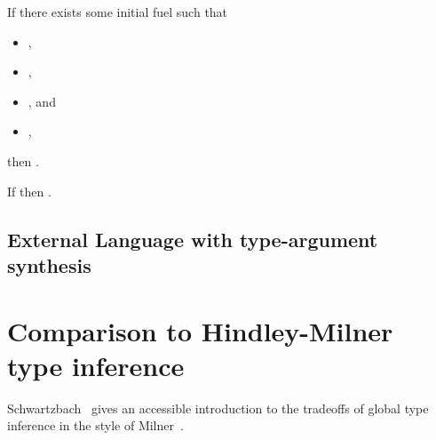 \begin{lemma}
  If there exists some initial fuel \ltiFuel{} such that
  \begin{itemize}
    \item
    \ltitSstkjudgement{\ltimakeCombinedThreadedEnv{\ltiFuel{}}{\ltiEmptyClosureCache}}
                      {\ltiEnv{}}
                      {}
                      {\ltiT{}}
                      {\ltimakeCombinedThreadedEnv{\ltiFuelp{}}{\ltiClosureCache{}}}
                      {},
    \item \ltielimClosEnv{\ltiClosureCache{}}{\ltiEnv{}}{\ltiEnvp{}},
    \item {}, and
    \item \ltielimClosT{\varnothing}{\ltiClosureCache{}}{\ltiT{}}{\ltiTp{}},
  \end{itemize}
                      then
    \ltitSdjudgement{\ltiEnvp{}}
                    {}
                    {\ltiTp{}}
                    {\ltiEp{}}.
\end{lemma}

\begin{lemma}
  If \ltitSdjudgement{\ltiEnvp{}}
                     {\ltiE{}}
                     {\ltiT{}}
                     {\ltiEp{}}
                     then
    \ltitSstkjudgement{\ltimakeCombinedThreadedEnv{\ltiFuel{}}{\ltiEmptyClosureCache}}
                      {\ltiEnv{}}
                      {}
                      {\ltiT{}}
                      {\ltimakeCombinedThreadedEnv{\ltiFuelp{}}{\ltiClosureCache{}}}
                      {}.
\end{lemma}

\subsection{External Language with type-argument synthesis}


\section{Comparison to Hindley-Milner type inference}

Schwartzbach~\cite{schwartzbach1995polymorphic}
gives an accessible introduction to the tradeoffs of
global type inference
in the style of Milner~\cite{milner1978theory}.

